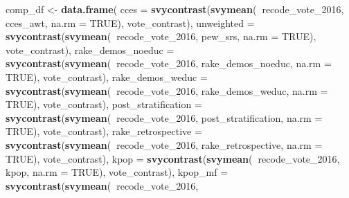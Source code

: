 \documentclass[]{article}
\newenvironment{Shaded}{\begin{snugshade}}{\end{snugshade}}
\newcommand{\DataTypeTok}[1]{\textcolor[rgb]{0.13,0.29,0.53}{#1}}
\newcommand{\DecValTok}[1]{\textcolor[rgb]{0.00,0.00,0.81}{#1}}
\newcommand{\KeywordTok}[1]{\textcolor[rgb]{0.13,0.29,0.53}{\textbf{#1}}}
\newcommand{\NormalTok}[1]{#1}
\newcommand{\OperatorTok}[1]{\textcolor[rgb]{0.81,0.36,0.00}{\textbf{#1}}}
\newcommand{\OtherTok}[1]{\textcolor[rgb]{0.56,0.35,0.01}{#1}}
\newcommand{\StringTok}[1]{\textcolor[rgb]{0.31,0.60,0.02}{#1}}
\begin{document}
\begin{Shaded}
\begin{Highlighting}[]
\NormalTok{comp_df <-}\StringTok{ }\KeywordTok{data.frame}\NormalTok{(}
    \DataTypeTok{cces =} \KeywordTok{svycontrast}\NormalTok{(}\KeywordTok{svymean}\NormalTok{(}\OperatorTok{~}\NormalTok{recode_vote_}\DecValTok{2016}\NormalTok{, }
\NormalTok{                               cces_awt, }\DataTypeTok{na.rm =} \OtherTok{TRUE}\NormalTok{),}
\NormalTok{                       vote_contrast),}
    \DataTypeTok{unweighted =} \KeywordTok{svycontrast}\NormalTok{(}\KeywordTok{svymean}\NormalTok{(}\OperatorTok{~}\NormalTok{recode_vote_}\DecValTok{2016}\NormalTok{, }
\NormalTok{                                     pew_srs, }\DataTypeTok{na.rm =} \OtherTok{TRUE}\NormalTok{),}
\NormalTok{                        vote_contrast),}
    \DataTypeTok{rake_demos_noeduc =} \KeywordTok{svycontrast}\NormalTok{(}\KeywordTok{svymean}\NormalTok{(}\OperatorTok{~}\NormalTok{recode_vote_}\DecValTok{2016}\NormalTok{, }
\NormalTok{                                            rake_demos_noeduc, }\DataTypeTok{na.rm =} \OtherTok{TRUE}\NormalTok{),}
\NormalTok{                        vote_contrast),}
    \DataTypeTok{rake_demos_weduc =} \KeywordTok{svycontrast}\NormalTok{(}\KeywordTok{svymean}\NormalTok{(}\OperatorTok{~}\NormalTok{recode_vote_}\DecValTok{2016}\NormalTok{, }
\NormalTok{                                           rake_demos_weduc, }\DataTypeTok{na.rm =} \OtherTok{TRUE}\NormalTok{),}
\NormalTok{                        vote_contrast),}
    \DataTypeTok{post_stratification =} \KeywordTok{svycontrast}\NormalTok{(}\KeywordTok{svymean}\NormalTok{(}\OperatorTok{~}\NormalTok{recode_vote_}\DecValTok{2016}\NormalTok{, }
\NormalTok{                                              post_stratification, }\DataTypeTok{na.rm =} \OtherTok{TRUE}\NormalTok{),}
\NormalTok{                        vote_contrast),}
    \DataTypeTok{rake_retrospective =} \KeywordTok{svycontrast}\NormalTok{(}\KeywordTok{svymean}\NormalTok{(}\OperatorTok{~}\NormalTok{recode_vote_}\DecValTok{2016}\NormalTok{, }
\NormalTok{                                             rake_retrospective, }\DataTypeTok{na.rm =} \OtherTok{TRUE}\NormalTok{),}
\NormalTok{                        vote_contrast),}
    \DataTypeTok{kpop =} \KeywordTok{svycontrast}\NormalTok{(}\KeywordTok{svymean}\NormalTok{(}\OperatorTok{~}\NormalTok{recode_vote_}\DecValTok{2016}\NormalTok{, }
\NormalTok{                               kpop, }\DataTypeTok{na.rm =} \OtherTok{TRUE}\NormalTok{),}
\NormalTok{                        vote_contrast),}
    \DataTypeTok{kpop_mf =} \KeywordTok{svycontrast}\NormalTok{(}\KeywordTok{svymean}\NormalTok{(}\OperatorTok{~}\NormalTok{recode_vote_}\DecValTok{2016}\NormalTok{, }

\end{Highlighting}
\end{Shaded}
\end{document}
